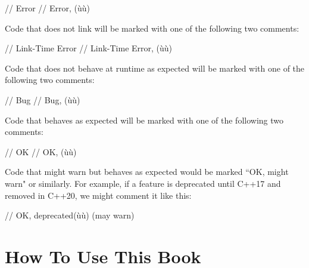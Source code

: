 \begin{emcppslisting}
// Error
// Error, (ù{}ù)
\end{emcppslisting}

\noindent Code that does not link will be marked with one of the following two comments:

\begin{emcppslisting}
// Link-Time Error
// Link-Time Error, (ù{}ù)
\end{emcppslisting}

\noindent Code that does not behave at runtime as expected will be marked with one of the following two comments:

\begin{emcppslisting}
// Bug
// Bug, (ù{}ù)
\end{emcppslisting}

\noindent Code that behaves as expected will be marked with one of the following two comments:

\begin{emcppslisting}
// OK
// OK, (ù{}ù)
\end{emcppslisting}

\noindent Code that might warn but behaves as expected would be marked ``OK, might warn" or similarly. For example, if a feature is deprecated until C++17 and removed in C++20, we might comment it like this:

\begin{emcppslisting}
// OK, deprecated(ù{\footnotemark}ù) (may warn)
\end{emcppslisting}

\section{How To Use This Book}

